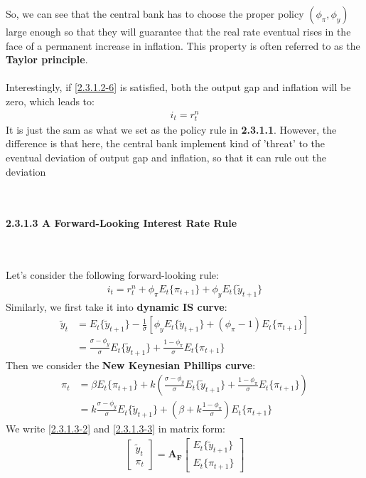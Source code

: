 \documentclass{article}
\numberwithin{equation}{section}
\begin{document}
So, we can see that the central bank has to choose the proper policy $(\phi_\pi, \phi_y)$ large enough so that they will guarantee that the real rate eventual rises in the face of a permanent increase in inflation. This property is often referred to as the \textbf{Taylor principle}.\\\\
Interestingly, if \eqref{2.3.1.2-6} is satisfied, both the output gap and inflation will be zero, which leads to:
	\begin{align*}
		i_t = r^n_t
	\end{align*}
It is just the sam as what we set as the policy rule in \textbf{2.3.1.1}. However, the difference is that here, the central bank implement kind of 'threat' to the eventual deviation of output gap and inflation, so that it can rule out the deviation\\\\\\
\centerline{\textbf{2.3.1.3 A Forward-Looking Interest Rate Rule}}\\\\
Let's consider the following forward-looking rule:
	\begin{align}
		i_t = r^n_t + \phi_\pi E_t\{\pi_{t+1}\} + \phi_y E_t\{\tilde{y}_{t+1}\} \label{2.3.1.3-1}
	\end{align}
Similarly, we first take it into \textbf{dynamic IS curve}:
	\begin{align}
		\tilde{y}_t &= E_t\{\tilde{y}_{t+1}\} - \frac{1}{\sigma} [ \phi_y E_t\{\tilde{y}_{t+1}\} + (\phi_\pi - 1) E_t\{\pi_{t+1}\}] \nonumber\\
		&= \frac{\sigma - \phi_y}{\sigma} E_t\{\tilde{y}_{t+1}\} + \frac{1 - \phi_\pi}{\sigma} E_t\{\pi_{t+1}\} \label{2.3.1.3-2}
	\end{align}
Then we consider the \textbf{New Keynesian Phillips curve}:
	\begin{align}
		\pi_t &= \beta E_t\{\pi_{t+1}\} + k \left( \frac{\sigma - \phi_y}{\sigma} E_t\{\tilde{y}_{t+1}\} + \frac{1 - \phi_\pi}{\sigma} E_t\{\pi_{t+1}\} \right) \nonumber\\
		&= k\frac{\sigma - \phi_y}{\sigma}E_t\{\tilde{y}_{t+1}\} + \left( \beta + k\frac{1 - \phi_\pi}{\sigma} \right)E_t\{\pi_{t+1}\} \label{2.3.1.3-3}
	\end{align}
We write \eqref{2.3.1.3-2} and \eqref{2.3.1.3-3} in matrix form:
	\begin{align}
		\begin{bmatrix}
			\tilde{y}_t\\
			\pi_t
		\end{bmatrix} = \boldsymbol{A_F}
		\begin{bmatrix}
			E_t\{\tilde{y}_{t+1}\}\\
			E_t\{\pi_{t+1}\} 
		\end{bmatrix} \label{2.3.1.3-4}
	\end{align}
\end{document}
